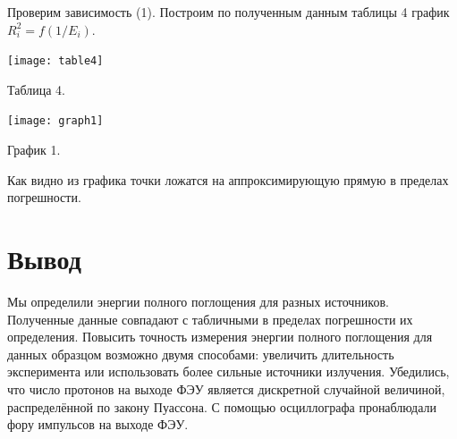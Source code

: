 \documentclass[a4paper,12pt]{article} %
\begin{document}
Проверим зависимость (1). Построим по полученным данным таблицы 4 график $R^2_i = f(1/E_i)$. 
\begin{center}
\texttt{[image: table4]}

Таблица 4.
\end{center}
\begin{center}
\texttt{[image: graph1]}

График 1.
\end{center}
Как видно из графика точки ложатся на аппроксимирующую прямую в пределах погрешности.

\section*{Вывод}
Мы определили энергии полного поглощения для разных источников. Полученные данные совпадают с табличными в пределах погрешности их определения. Повысить точность измерения энергии полного поглощения для данных образцом возможно двумя способами: увеличить длительность эксперимента или использовать более сильные источники излучения. Убедились, что число протонов на выходе ФЭУ является дискретной случайной величиной, распределённой по закону Пуассона. С помощью осциллографа пронаблюдали фору импульсов на выходе ФЭУ. 
\end{document}
